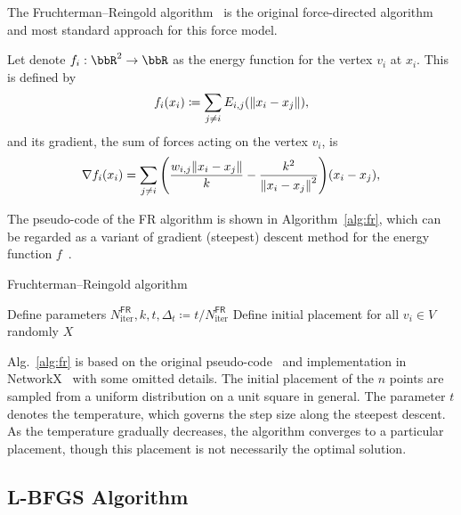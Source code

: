 \documentclass[dvipdfmx,10pt,journal,compsoc]{IEEEtran}
\newcommand{\defeq}{\coloneqq}
\begin{document}
The Fruchterman--Reingold algorithm~\cite{fruchtermanGraphDrawingForcedirected1991} is the original force-directed algorithm and most standard approach for this force model.

Let denote $f_i: \bbR^2 \to \bbR$ as the energy function for the vertex $v_i$ at $x_i$. This is defined by
\begin{equation}\label{eq:fi}
  f_i(x_i) \defeq \sum_{j \neq i} E_{i,j}(\norm{x_i - x_j}),
\end{equation}
and its gradient, the sum of forces acting on the vertex $v_i$, is
\begin{equation}\label{eq:gradientFi}
  \nabla f_i(x_i) = \sum_{j \neq i} \qty(\frac{w_{i,j}\norm{x_i - x_j}}{k} - \frac{k^2}{\norm{x_i - x_j}^2}) (x_i-x_j),
\end{equation}

The pseudo-code of the FR algorithm is shown in Algorithm~\ref{alg:fr}, which can be regarded as a variant of gradient (steepest) descent method for the energy function $f$~\cite{tunkelang1999numerical}.
\begin{algorithm}[h]
  \caption{Fruchterman--Reingold algorithm}
  \label{alg:fr}

  Define parameters $N_\mathrm{iter}^\mathsf{FR}, k, t, \Delta_t \defeq t/N_\mathrm{iter}^\mathsf{FR}$\;
  Define initial placement for all $v_i \in V$ randomly\;
  \Return $X$\;
\end{algorithm}
Alg.~\ref{alg:fr} is based on the original pseudo-code~\cite{fruchtermanGraphDrawingForcedirected1991} and implementation in NetworkX~\cite{hagberg2008exploring} with some omitted details.
The initial placement of the $n$ points are sampled from a uniform distribution on a unit square in general.
The parameter $t$ denotes the temperature, which governs the step size along the steepest descent. As the temperature gradually decreases, the algorithm converges to a particular placement, though this placement is not necessarily the optimal solution.

\subsection{L-BFGS Algorithm}\label{ssec:lbfgs}
\end{document}
